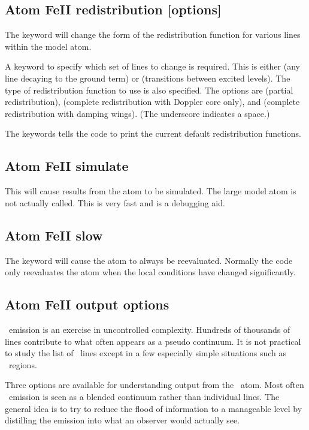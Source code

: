 \subsection{Atom FeII redistribution [options]}

The keyword  will change
the form of the redistribution
function for various lines within the model atom.

A keyword to specify which set of lines to change is required.
This
is either  (any line decaying to the ground term)
or 
(transitions between excited levels).
The type of redistribution function
to use is also specified.
The options are  (partial redistribution),
 (complete redistribution with Doppler core only),
and  (complete
redistribution with damping wings).
(The underscore indicates a space.)

The keywords  tells the code to print
the current default redistribution functions.

\subsection{Atom FeII simulate}

This will cause results from the atom to be simulated.  The large model
atom is not actually called.  This is very fast and is a debugging aid.

\subsection{Atom FeII slow}

The keyword  will cause the atom to always be reevaluated.  Normally
the code only reevaluates the atom when the local conditions have changed
significantly.

\subsection{Atom FeII output options}

\feii\ emission is an exercise in uncontrolled complexity.  Hundreds of
thousands of lines contribute to what often appears as a pseudo continuum.
It is not practical to study the list of \feii\ lines
except in a few especially
simple situations such as \hii\ regions.

Three options are available for understanding output from the \feii\ atom.
Most often \feii\ emission is seen as a blended continuum rather than
individual lines.  The general idea is to try to reduce the flood of
information to a manageable level by distilling the emission into what an
observer would actually see.

